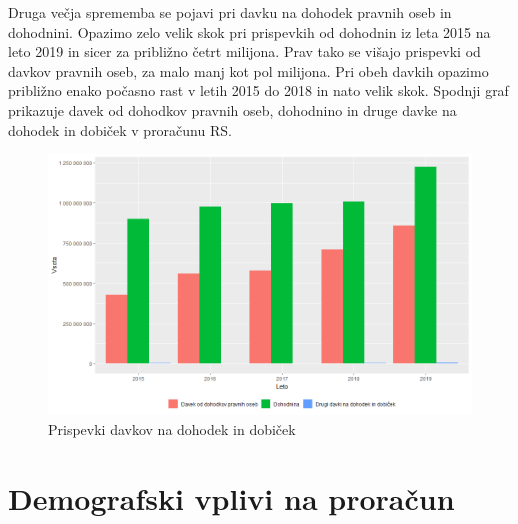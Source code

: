 \documentclass[12pt, a4paper]{article}
\begin{document}
\hspace*{5mm} Druga večja sprememba se pojavi pri davku na dohodek pravnih oseb in dohodnini. Opazimo zelo velik skok pri prispevkih od dohodnin iz leta 2015 na leto 2019 in sicer za približno četrt milijona. Prav tako se višajo prispevki od davkov pravnih oseb, za malo manj kot pol milijona. Pri obeh davkih opazimo približno enako počasno rast v letih 2015 do 2018 in nato velik skok. Spodnji graf prikazuje davek od dohodkov pravnih oseb, dohodnino in druge davke na dohodek in dobiček v proračunu RS.
\begin{figure}[h!]
\centering
\includegraphics[width = 14 cm]{davki_na_dohodek_in_dobicek_graf.png}
\caption{Prispevki davkov na dohodek in dobiček}
\label{Slika 2}
\end{figure}

\newpage
\section[Demografski vplivi na proračun]{Demografski vplivi na proračun}
\end{document}
